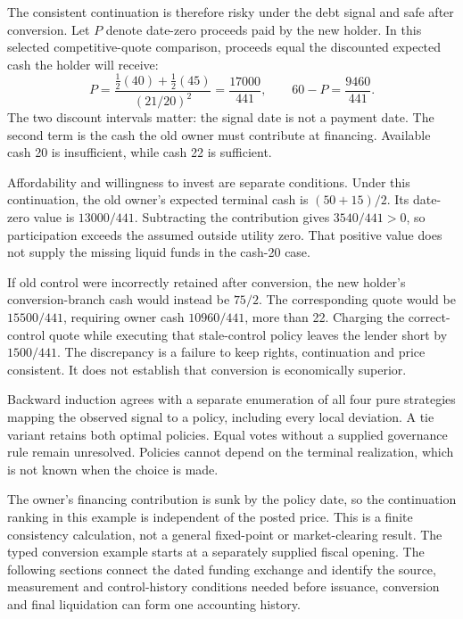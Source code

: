 The consistent continuation is therefore risky under the debt signal and
safe after conversion. Let $P$ denote date-zero proceeds paid by the new
holder. In this selected competitive-quote comparison, proceeds equal the
discounted expected cash the holder will receive:
\begin{equation}
 P=\frac{\tfrac12(40)+\tfrac12(45)}{(21/20)^2}
   =\frac{17000}{441},\qquad
 60-P=\frac{9460}{441}.
 \label{sim:control-dependent-quote}
\end{equation}
The two discount intervals matter: the signal date is not a payment date.
The second term is the cash the old owner must contribute at financing.
Available cash 20 is insufficient, while cash 22 is sufficient.

Affordability and willingness to invest are separate conditions. Under
this continuation, the old owner's expected terminal cash is
$(50+15)/2$. Its date-zero value is $13000/441$. Subtracting the
contribution gives $3540/441>0$, so participation exceeds the assumed
outside utility zero. That positive value does not supply the missing
liquid funds in the cash-20 case.

If old control were incorrectly retained after conversion, the new
holder's conversion-branch cash would instead be $75/2$. The corresponding
quote would be $15500/441$, requiring owner cash $10960/441$, more than
22. Charging the correct-control quote while executing that stale-control
policy leaves the lender short by $1500/441$. The discrepancy is a
failure to keep rights, continuation and price consistent. It does not
establish that conversion is economically superior.

Backward induction agrees with a separate enumeration of all four pure
strategies mapping the observed signal to a policy, including every local
deviation. A tie variant retains both optimal policies. Equal votes without
a supplied governance rule remain unresolved. Policies cannot depend on
the terminal realization, which is not known when the choice is made.

The owner's financing contribution is sunk by the policy date, so the
continuation ranking in this example is independent of the posted price.
This is a finite consistency calculation, not a general fixed-point or
market-clearing result. The typed conversion example starts at a separately
supplied fiscal opening. The following sections connect the dated funding
exchange and identify the source, measurement and control-history conditions
needed before issuance, conversion and final liquidation can form one
accounting history.



